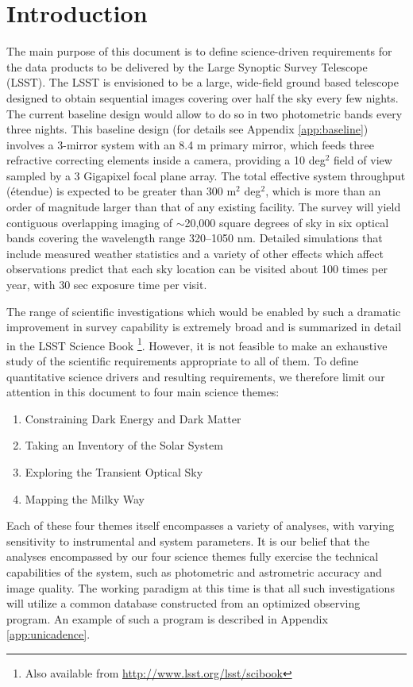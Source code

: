\section{Introduction}

The main purpose of this document is to define science-driven requirements for the
data products to be delivered by the Large Synoptic Survey Telescope (LSST).
The LSST is envisioned to be a large, wide-field ground based telescope
designed to obtain sequential images covering over half the sky every few nights.
The current baseline design would allow to do so in two photometric bands every three
nights. This baseline design (for details see Appendix \ref{app:baseline}) involves a 3-mirror system with an
8.4 m primary mirror, which feeds three refractive correcting elements inside a camera,
providing a 10 deg$^2$ field of view sampled by a 3 Gigapixel focal plane array.
The total effective system throughput (\'etendue) is expected to be greater than
300 m$^2$ deg$^2$,
which is more than an order of magnitude larger than that of any existing facility.
The survey will yield contiguous overlapping imaging of $\sim$20,000 square degrees
of sky in six optical bands covering the wavelength range 320--1050 nm.
Detailed simulations that include measured weather statistics and a variety
of other effects which affect observations predict that each sky location can be
visited about 100 times per year, with 30 sec exposure time per visit.

The range of scientific investigations which would be enabled by such a
dramatic improvement in survey capability is extremely broad and
is summarized in detail in the LSST Science Book \citep{2009arXiv0912.0201L}\footnote{Also available from
\url{http://www.lsst.org/lsst/scibook}}.  However, it is not feasible to make an exhaustive study of the scientific requirements
appropriate to all of them. To define quantitative science drivers and resulting requirements,
we therefore limit our attention in this document to four
main science themes:
\begin{enumerate}
\item Constraining Dark Energy and Dark Matter
\item Taking an Inventory of the Solar System
\item Exploring the Transient Optical Sky
\item Mapping the Milky Way
\end{enumerate}

Each of these four themes itself encompasses a variety of analyses, with
varying sensitivity to instrumental and system parameters.  It is our belief
that the analyses encompassed by our four science themes
fully exercise the technical capabilities of the system,
such as photometric and astrometric accuracy and image quality.  The working
paradigm at this time is that all such investigations will utilize a common
database constructed from an optimized observing program. An example of
such a program is described in Appendix \ref{app:unicadence}.

